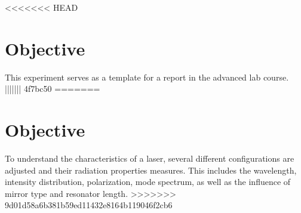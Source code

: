 <<<<<<< HEAD
\section{Objective}
\label{sec:objective}

This experiment serves as a template for a report in the advanced lab course.
||||||| 4f7bc50
=======
\section{Objective}

To understand the characteristics of a \HeNe laser, several different configurations are adjusted and their radiation properties measures. This
includes the wavelength, intensity distribution, polarization, mode spectrum, as well as the influence of mirror type and resonator length.
>>>>>>> 9d01d58a6b381b59ed11432e8164b119046f2cb6
